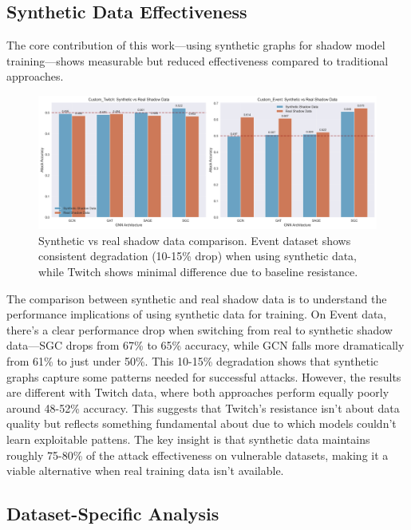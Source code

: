 \documentclass{article}
\begin{document}
\subsection{Synthetic Data Effectiveness}
The core contribution of this work—using synthetic graphs for shadow model training—shows measurable but reduced effectiveness compared to traditional approaches.

\begin{figure}[H]
\centering
\includegraphics[width=\textwidth]{../Results/visualizations/synthetic_vs_real_comparison.png}
\caption{Synthetic vs real shadow data comparison. Event dataset shows consistent degradation (10-15\% drop) when using synthetic data, while Twitch shows minimal difference due to baseline resistance.}
\label{fig:synthetic-comparison}
\end{figure}

The comparison between synthetic and real shadow data is to understand the performance implications of using synthetic data for training. On Event data, there's a clear performance drop when switching from real to synthetic shadow data—SGC drops from 67\% to 65\% accuracy, while GCN falls more dramatically from 61\% to just under 50\%. This 10-15\% degradation shows that synthetic graphs capture some patterns needed for successful attacks. However, the results are different with Twitch data, where both approaches perform equally poorly around 48-52\% accuracy. This suggests that Twitch's resistance isn't about data quality but reflects something fundamental about due to which models couldn't learn exploitable pattens. The key insight is that synthetic data maintains roughly 75-80\% of the attack effectiveness on vulnerable datasets, making it a viable alternative when real training data isn't available.

\subsection{Dataset-Specific Analysis}
\end{document}
